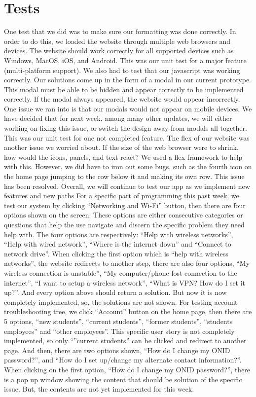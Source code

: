 \documentclass[12pt, letterpaper]{article}
\begin{document}
	\section{Tests}
One test that we did was to make sure our formatting was done correctly. In order to do this, we loaded the website through multiple web browsers and devices. The website should work correctly for all supported devices such as Windows, MacOS, iOS, and Android. This was our unit test for a major feature (multi-platform support). We also had to test that our javascript was working correctly. Our solutions come up in the form of a modal in our current prototype. This modal must be able to be hidden and appear correctly to be implemented correctly. If the modal always appeared, the website would appear incorrectly. One issue we ran into is that our modals would not appear on mobile devices. We have decided that for next week, among many other updates, we will either working on fixing this issue, or switch the design away from modals all together. This was our unit test for one not completed feature.
The flex of our website was another issue we worried about. If the size of the web browser were to shrink, how would the icons, panels, and text react? We used a flex framework to help with this. However, we did have to iron out some bugs, such as the fourth icon on the home page jumping to the row below it and making its own row. This issue has been resolved. Overall, we will continue to test our app as we implement new features and new paths
For a specific part of programming this past week, we test our system by clicking “Networking and Wi-Fi” button, then there are four options shown on the screen. These options are either consecutive categories or questions that help the use navigate and discern the specific problem they need help with.  The four options are respectively: “Help with wireless networks”, “Help with wired network”, “Where is the internet down” and “Connect to network drive”. When clicking the first option which is “help with wireless networks”, the website redirects to another step, there are also four options, “My wireless connection is unstable”, “My computer/phone lost connection to the internet”, “I want to setup a wireless network”, “What is VPN? How do I set it up?”. And every option above should return a solution. But now it is now completely implemented, so, the solutions are not shown.
For testing account troubleshooting tree, we click “Account” button on the home page, then there are 5 options, “new students”, “current students”, “former students”, “students employees” and “other employees”.  This specific user story is not completely implemented, so only “”current students” can be clicked and redirect to another page. And then, there are two options shown, “How do I change my ONID password?”, and “How do I set up/change my alternate contact information?”.  When clicking on the first option, “How do I change my ONID password?”, there is a pop up window showing the content that should be solution of the specific issue. But, the contents are not yet implemented for this week.
\end{document}

